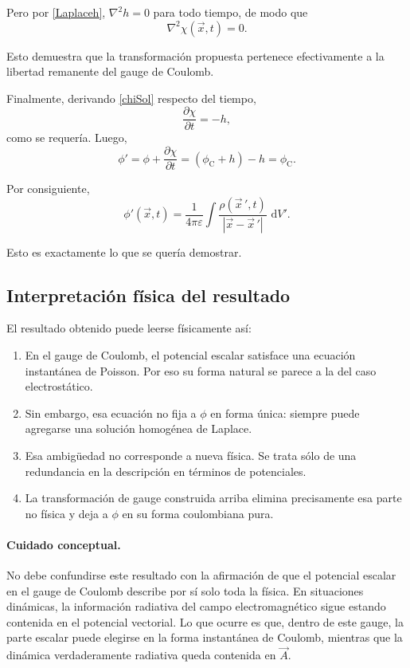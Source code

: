 \documentclass{article}
\numberwithin{equation}{section}
\newcommand{\dd}{\,\mathrm{d}}
\newcommand{\A}{\vec A}
\newcommand{\x}{\vec x}
\newcommand{\xp}{\vec x\,'}
\newcommand{\eps}{\varepsilon}
\begin{document}
Pero por \eqref{Laplaceh}, $\nabla^2 h=0$ para todo tiempo, de modo que
\begin{equation}
\nabla^2\chi(\x,t)=0.
\end{equation}

Esto demuestra que la transformación propuesta pertenece efectivamente a la libertad remanente del gauge de Coulomb.

Finalmente, derivando \eqref{chiSol} respecto del tiempo,
\begin{equation}
\frac{\partial\chi}{\partial t}=-h,
\end{equation}
como se requería. Luego,
\begin{equation}
\phi'=
\phi+\frac{\partial\chi}{\partial t}
=(\phi_{\mathrm C}+h)-h
=\phi_{\mathrm C}.
\end{equation}

Por consiguiente,
\begin{equation}
\boxed{\phi'(\x,t)=\frac{1}{4\pi\eps}\int\frac{\rho(\xp,t)}{|\x-\xp|}\,\dd V'.}
\end{equation}

Esto es exactamente lo que se quería demostrar.

\subsection{Interpretación física del resultado}

El resultado obtenido puede leerse físicamente así:
\begin{enumerate}[leftmargin=1.5em]
    \item En el gauge de Coulomb, el potencial escalar satisface una ecuación instantánea de Poisson. Por eso su forma natural se parece a la del caso electrostático.
    \item Sin embargo, esa ecuación no fija a $\phi$ en forma única: siempre puede agregarse una solución homogénea de Laplace.
    \item Esa ambigüedad no corresponde a nueva física. Se trata sólo de una redundancia en la descripción en términos de potenciales.
    \item La transformación de gauge construida arriba elimina precisamente esa parte no física y deja a $\phi$ en su forma coulombiana pura.
\end{enumerate}


\paragraph{Cuidado conceptual.}
No debe confundirse este resultado con la afirmación de que el potencial escalar en el gauge de Coulomb describe por sí solo toda la física. En situaciones dinámicas, la información radiativa del campo electromagnético sigue estando contenida en el potencial vectorial. Lo que ocurre es que, dentro de este gauge, la parte escalar puede elegirse en la forma instantánea de Coulomb, mientras que la dinámica verdaderamente radiativa queda contenida en $\A$.
\end{document}
